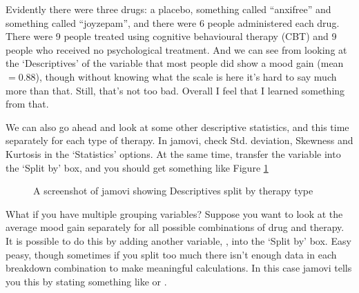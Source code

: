 Evidently there were three drugs: a placebo, something called ``anxifree'' and something called ``joyzepam'', and there were 6 people administered each drug. There were 9 people treated using cognitive behavioural therapy (CBT) and 9 people who received no psychological treatment. And we can see from looking at the `Descriptives' of the  variable that most people did show a mood gain (mean $=0.88$), though without knowing what the scale is here it's hard to say much more than that. Still, that's not too bad. Overall I feel that I learned something from that.

We can also go ahead and look at some other descriptive statistics, and this time separately for each type of therapy. In jamovi, check Std. deviation, Skewness and Kurtosis in the `Statistics' options. At the same time, transfer the  variable into the `Split by' box, and you should get something like Figure \ref{fig:clinicaltrial_grouping}

\vspace{0.5cm}
\begin{figure}[htb]
\begin{center}
\caption{A screenshot of jamovi showing Descriptives split by therapy type}
\label{fig:clinicaltrial_grouping}
\HR
\end{center}
\end{figure}

What if you have multiple grouping variables? Suppose you want to look at the average mood gain separately for all possible combinations of drug and therapy. It is possible to do this by adding another variable, , into the `Split by' box. Easy peasy, though sometimes if you split too much there isn't enough data in each breakdown combination to make meaningful calculations. In this case jamovi tells you this by stating something like  or .


